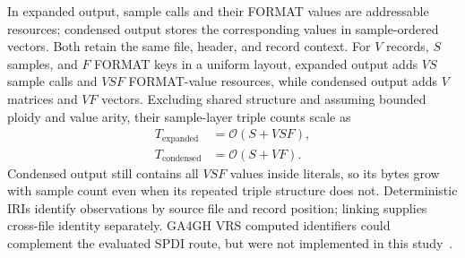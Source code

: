 \documentclass[11pt]{article}
\begin{document}
In expanded output, sample calls and their FORMAT values are addressable resources; condensed output stores the corresponding values in sample-ordered vectors.
Both retain the same file, header, and record context.
For $V$ records, $S$ samples, and $F$ FORMAT keys in a uniform layout, expanded output adds $VS$ sample calls and $VSF$ FORMAT-value resources, while condensed output adds $V$ matrices and $VF$ vectors.
Excluding shared structure and assuming bounded ploidy and value arity, their sample-layer triple counts scale as
\begin{equation}
\begin{aligned}
T_{\mathrm{expanded}} &= \mathcal{O}(S+VSF),\\
T_{\mathrm{condensed}} &= \mathcal{O}(S+VF).
\end{aligned}
\label{eq:sample-profile-scaling}
\end{equation}
Condensed output still contains all $VSF$ values inside literals, so its bytes grow with sample count even when its repeated triple structure does not.
Deterministic IRIs identify observations by source file and record position; linking supplies cross-file identity separately.
GA4GH VRS computed identifiers could complement the evaluated SPDI route, but were not implemented in this study~\cite{ga4gh2025VRS}.
\end{document}
